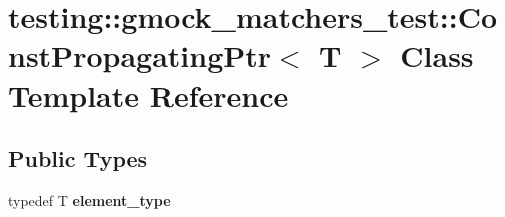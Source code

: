 \hypertarget{classtesting_1_1gmock__matchers__test_1_1ConstPropagatingPtr}{}\section{testing\+:\+:gmock\+\_\+matchers\+\_\+test\+:\+:Const\+Propagating\+Ptr$<$ T $>$ Class Template Reference}
\label{classtesting_1_1gmock__matchers__test_1_1ConstPropagatingPtr}
\subsection*{Public Types}
\begin{DoxyCompactItemize}
\item 
\mbox{\label{classtesting_1_1gmock__matchers__test_1_1ConstPropagatingPtr_a2ad1f3127185fadd33eed42627ed5644}} 
typedef T {\bfseries element\+\_\+type}
\end{DoxyCompactItemize}
